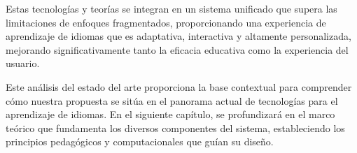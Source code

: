 Estas tecnologías y teorías se integran en un sistema unificado que supera las limitaciones de enfoques fragmentados, proporcionando una experiencia de aprendizaje de idiomas que es adaptativa, interactiva y altamente personalizada, mejorando significativamente tanto la eficacia educativa como la experiencia del usuario.

Este análisis del estado del arte proporciona la base contextual para comprender cómo nuestra propuesta se sitúa en el panorama actual de tecnologías para el aprendizaje de idiomas. En el siguiente capítulo, se profundizará en el marco teórico que fundamenta los diversos componentes del sistema, estableciendo los principios pedagógicos y computacionales que guían su diseño.